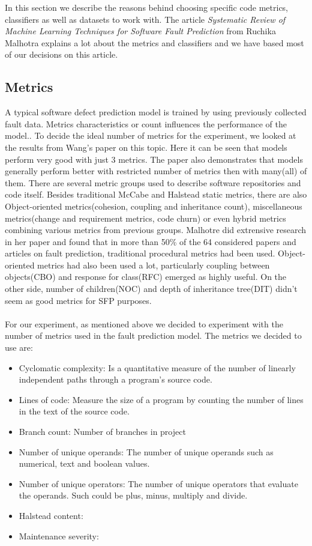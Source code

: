 In this section we describe the reasons behind choosing specific code metrics, classifiers as well as datasets to work with. The article \textit{Systematic Review of Machine Learning Techniques for Software Fault Prediction}\cite{malhotra2015systematic} from Ruchika Malhotra explains a lot about the metrics and classifiers and we have based most of our decisions on this article.
\subsection{Metrics}
A typical software defect prediction model is trained by using previously collected fault data. Metrics characteristics or count influences the performance of the model.\cite{wang2011many}. To decide the ideal number of metrics for the experiment, we looked at the results from Wang's paper on this topic\cite{wang2011many}. Here it can be seen that models perform very good with just 3 metrics. The paper also demonstrates that models generally perform better with restricted number of metrics then with many(all) of them. There are several metric groups used to describe software repositories and code itself. Besides traditional McCabe and Halstead static metrics, there are also Object-oriented metrics(cohesion, coupling and inheritance count), miscellaneous metrics(change and requirement metrics, code churn) or even hybrid metrics combining various metrics from previous groups. Malhotre did extrensive research in her paper and found that in more than 50\% of the 64 considered papers and articles on fault prediction, traditional procedural metrics had been used. Object-oriented metrics had also been used a lot, particularly coupling between objects(CBO) and response for class(RFC) emerged as highly useful. On the other side, number of children(NOC) and depth of inheritance tree(DIT) didn't seem as
good metrics for SFP purposes\cite[p.~15]{malhotra2015systematic}.\\\\
For our experiment, as mentioned above we decided to experiment with the number of metrics used in the fault prediction model. The metrics we decided to use are:\\
\begin{itemize}
\item Cyclomatic complexity: Is a quantitative measure of the number of linearly independent paths through a program's source code. 
\item Lines of code: Measure the size of a program by counting the number of lines in the text of the source code.
\item Branch count: Number of branches in project 
\item Number of unique operands: The number of unique operands such as numerical, text and boolean values.
\item Number of unique operators: The number of unique operators that evaluate the operands. Such could be plus, minus, multiply and divide. 
\item Halstead content: 
\item Maintenance severity: 
\end{itemize}
